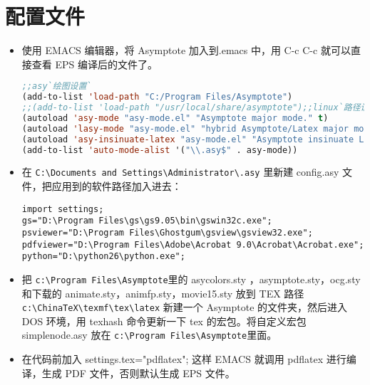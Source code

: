 \section{配置文件}
\begin{itemize}

  \item 使用 EMACS 编辑器，将 Asymptote 加入到.emacs 中，用 C-c C-c 就可以直接查看 EPS 编译后的文件了。
\scriptsize
{}
\begin{lstlisting}[language={Lisp}]
;;asy`绘图设置`
(add-to-list 'load-path "C:/Program Files/Asymptote")
;;(add-to-list 'load-path "/usr/local/share/asymptote");;linux`路径设置`
(autoload 'asy-mode "asy-mode.el" "Asymptote major mode." t)
(autoload 'lasy-mode "asy-mode.el" "hybrid Asymptote/Latex major mode." t)
(autoload 'asy-insinuate-latex "asy-mode.el" "Asymptote insinuate LaTeX." t)
(add-to-list 'auto-mode-alist '("\\.asy$" . asy-mode))
\end{lstlisting}
\xiaosi

  \item 在 \verb$C:\Documents and Settings\Administrator\.asy$ 里新建 config.asy 文件，把应用到的软件路径加入进去：
\scriptsize
\begin{lstlisting}
import settings;
gs="D:\Program Files\gs\gs9.05\bin\gswin32c.exe";
psviewer="D:\Program Files\Ghostgum\gsview\gsview32.exe";
pdfviewer="D:\Program Files\Adobe\Acrobat 9.0\Acrobat\Acrobat.exe";
python="D:\python26\python.exe";
\end{lstlisting}
\xiaosi

  \item 把 \verb|c:\Program Files\Asymptote|里的 asycolors.sty ，asymptote.sty，ocg.sty 和下载的 animate.sty，animfp.sty，movie15.sty 放到 TEX 路径 \verb$c:\ChinaTeX\texmf\tex\latex$ 新建一个 Asymptote 的文件夹，然后进入 DOS 环境，用 texhash 命令更新一下 tex 的宏包。将自定义宏包simplenode.asy 放在  \verb|c:\Program Files\Asymptote|里面。

  \item 在代码前加入 settings.tex="pdflatex"; 这样 EMACS 就调用 pdflatex 进行编译，生成 PDF 文件，否则默认生成 EPS 文件。
\end{itemize}





